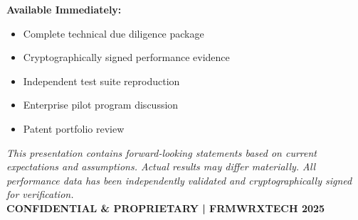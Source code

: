\documentclass{article}
\begin{document}
\textbf{Available Immediately:}
\begin{itemize}
    \item Complete technical due diligence package
    \item Cryptographically signed performance evidence
    \item Independent test suite reproduction
    \item Enterprise pilot program discussion
    \item Patent portfolio review
\end{itemize}

\textit{This presentation contains forward-looking statements based on current expectations and assumptions. Actual results may differ materially. All performance data has been independently validated and cryptographically signed for verification.} \\
\textbf{CONFIDENTIAL \& PROPRIETARY | FRMWRXTECH 2025}
\end{document}
